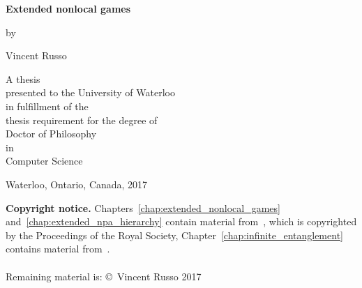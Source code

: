 %
\pagestyle{empty}

\begin{titlepage}
        \begin{center}
        \vspace*{1.0cm}

        \Huge
        {\bf Extended nonlocal games}

        \vspace*{1.0cm}

        \normalsize
        by \\

        \vspace*{1.0cm}

        \Large
        Vincent Russo \\

        \vspace*{3.0cm}

        \normalsize
        A thesis \\
        presented to the University of Waterloo \\ 
        in fulfillment of the \\
        thesis requirement for the degree of \\
        Doctor of Philosophy \\
        in \\
        Computer Science \\

        \vspace*{2.0cm}

        Waterloo, Ontario, Canada, 2017 \\

        \vspace*{1.0cm}

        \end{center}
\end{titlepage}

\noindent\textbf{Copyright notice.}
Chapters~\ref{chap:extended_nonlocal_games} and~\ref{chap:extended_npa_hierarchy} contain material from~\cite{Johnston2015a}, which is copyrighted by the Proceedings of the Royal Society, Chapter~\ref{chap:infinite_entanglement} contains material from~\cite{Russo2016}.%
\\ \\
Remaining material is:
\copyright\ Vincent Russo 2017 \\


